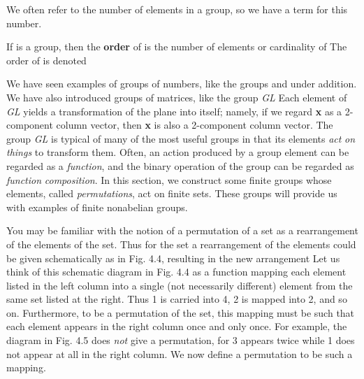 \documentclass[11pt,oneside]{article}
\begin{document}
\begin{BookBody}

We often refer to the number of elements in a group, so we have a term for this number.

 If  is a group, then the\textbf{ order} of  is the number of elements or cardinality of  The order of  is denoted \BookEnd{\blacksquare}


\noindent We have seen examples of groups of numbers, like the groups  and  under addition. We have also introduced groups of matrices, like the group\textit{ GL} Each element  of\textit{ GL} yields a transformation of the plane  into itself; namely, if we regard \textbf{x} as a 2-component column vector, then \textbf{x} is also a 2-component column vector. The group\textit{ GL} is typical of many of the most useful groups in that its elements\textit{ act} \textit{on things} to transform them. Often, an action produced by a group element can be regarded as a\textit{ function}, and the binary operation of the group can be regarded as\textit{ function} \textit{composition}. In this section, we construct some finite groups whose elements, called \textit{permutations}, act on finite sets. These groups will provide us with examples of finite nonabelian groups.

You may be familiar with the notion of a permutation of a set as a rearrangement of the elements of the set. Thus for the set  a rearrangement of the elements could be given schematically as in Fig. 4.4, resulting in the new arrangement   Let us think of this schematic diagram in Fig. 4.4 as a function mapping each element listed in the left column into a single (not necessarily different) element from the same set listed at the right. Thus 1 is carried into 4, 2 is mapped into 2, and so on. Furthermore, to be a permutation of the set, this mapping must be such that each element appears in the right column once and only once. For example, the diagram in Fig. 4.5 does\textit{ not} give a permutation, for 3 appears twice while 1 does not appear at all in the right column. We now define a permutation to be such a mapping.


\end{BookBody}
\end{document}
